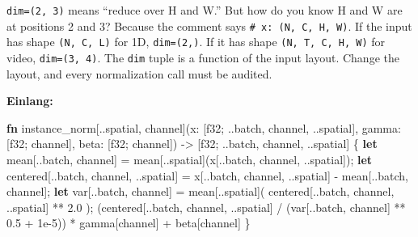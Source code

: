 \documentclass[11pt,titlepage]{article}
\newenvironment{Shaded}{}{}
\newcommand{\DataTypeTok}[1]{\textcolor[rgb]{0.56,0.13,0.00}{#1}}
\newcommand{\DecValTok}[1]{\textcolor[rgb]{0.25,0.63,0.44}{#1}}
\newcommand{\KeywordTok}[1]{\textcolor[rgb]{0.00,0.44,0.13}{\textbf{#1}}}
\newcommand{\NormalTok}[1]{#1}
\newcommand{\OperatorTok}[1]{\textcolor[rgb]{0.40,0.40,0.40}{#1}}
\begin{document}
\texttt{dim=(2,\ 3)} means ``reduce over H and W.'' But how do you know
H and W are at positions 2 and 3? Because the comment says
\texttt{\#\ x:\ (N,\ C,\ H,\ W)}. If the input has shape
\texttt{(N,\ C,\ L)} for 1D, \texttt{dim=(2,)}. If it has shape
\texttt{(N,\ T,\ C,\ H,\ W)} for video, \texttt{dim=(3,\ 4)}. The
\texttt{dim} tuple is a function of the input layout. Change the layout,
and every normalization call must be audited.

\textbf{Einlang:}

\begin{Shaded}
\begin{Highlighting}[]
\KeywordTok{fn}\NormalTok{ instance_norm[..spatial, channel](x: }\OperatorTok{[}\DataTypeTok{f32}\NormalTok{; ..batch, channel, ..spatial}\OperatorTok{]}\NormalTok{,}
\NormalTok{    gamma: }\OperatorTok{[}\DataTypeTok{f32}\NormalTok{; channel}\OperatorTok{]}\NormalTok{, beta: }\OperatorTok{[}\DataTypeTok{f32}\NormalTok{; channel}\OperatorTok{]}\NormalTok{)}
\NormalTok{    -> }\OperatorTok{[}\DataTypeTok{f32}\NormalTok{; ..batch, channel, ..spatial}\OperatorTok{]}
\OperatorTok{\{}
    \KeywordTok{let}\NormalTok{ mean}\OperatorTok{[}\NormalTok{..batch, channel}\OperatorTok{]}\NormalTok{ = mean}\OperatorTok{[}\NormalTok{..spatial}\OperatorTok{]}\NormalTok{(x}\OperatorTok{[}\NormalTok{..batch, channel, ..spatial}\OperatorTok{]}\NormalTok{);}
    \KeywordTok{let}\NormalTok{ centered}\OperatorTok{[}\NormalTok{..batch, channel, ..spatial}\OperatorTok{]}\NormalTok{ =}
\NormalTok{        x}\OperatorTok{[}\NormalTok{..batch, channel, ..spatial}\OperatorTok{]}\NormalTok{ - mean}\OperatorTok{[}\NormalTok{..batch, channel}\OperatorTok{]}\NormalTok{;}
    \KeywordTok{let}\NormalTok{ var}\OperatorTok{[}\NormalTok{..batch, channel}\OperatorTok{]}\NormalTok{ = mean}\OperatorTok{[}\NormalTok{..spatial}\OperatorTok{]}\NormalTok{(}
\NormalTok{        centered}\OperatorTok{[}\NormalTok{..batch, channel, ..spatial}\OperatorTok{]}\NormalTok{ ** }\DecValTok{2.0}
\NormalTok{    );}
\NormalTok{    (centered}\OperatorTok{[}\NormalTok{..batch, channel, ..spatial}\OperatorTok{]}\NormalTok{ / (var}\OperatorTok{[}\NormalTok{..batch, channel}\OperatorTok{]}\NormalTok{ ** }\DecValTok{0.5}\NormalTok{ + }\DecValTok{1}\NormalTok{e-}\DecValTok{5}\NormalTok{))}
\NormalTok{        * gamma}\OperatorTok{[}\NormalTok{channel}\OperatorTok{]}\NormalTok{ + beta}\OperatorTok{[}\NormalTok{channel}\OperatorTok{]}
\OperatorTok{\}}
\end{Highlighting}
\end{Shaded}
\end{document}
